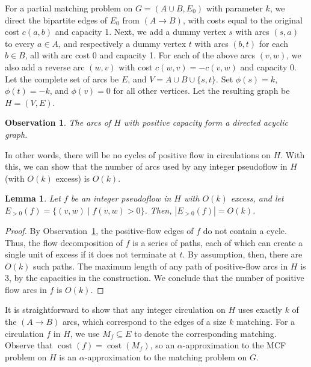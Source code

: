 \documentclass[11pt]{article}
\def\fsupply{\phi}
\theoremstyle{plain}
\newtheorem{lemma}{Lemma}
\newtheorem{observation}{Observation}
\def\cost{\operatorname{cost}}
\begin{document}
For a partial matching problem on $G = (A \cup B, E_0)$ with parameter $k$, we 
direct the bipartite edges of $E_0$ from $(A \to B)$, with costs equal to the 
original cost $c(a, b)$ and capacity 1.
Next, we add a dummy vertex $s$ with arcs $(s, a)$ to every $a \in A$,
and respectively a dummy vertex $t$ with arcs $(b, t)$ for each $b \in B$,
all with arc cost 0 and capacity 1.
For each of the above arcs $(v, w)$, we also add a reverse arc $(w, v)$ with
cost $c(w, v) = -c(v, w)$ and capacity 0.
Let the complete set of arcs be $E$, and $V = A \cup B \cup \{s, t\}$.
Set $\fsupply(s) = k$, $\fsupply(t) = -k$, and $\fsupply(v) = 0$ for all other 
vertices.
Let the resulting graph be $H = (V, E)$.

\begin{observation}
\label{observation:dag}
	The arcs of $H$ with positive capacity form a directed acyclic graph.
\end{observation}

In other words, there will be no cycles of positive flow in circulations on 
$H$. 
With this, we can show that the number of arcs used by any integer pseudoflow 
in $H$ (with $O(k)$ excess) is $O(k)$.

\begin{lemma}
\label{lemma:reduction_count}
	Let $f$ be an integer pseudoflow in $H$ with $O(k)$ excess, and let 
	$E_{>0}(f) = \{(v, w) \mid f(v, w) > 0\}$.
	Then, $|E_{>0}(f)| = O(k)$.
\end{lemma}
\begin{proof}
	By Observation~\ref{observation:dag}, the positive-flow edges of $f$
	do not contain a cycle.
	Thus, the flow decomposition of $f$ is a series of paths, each of which
	can create a single unit of excess if it does not terminate at $t$.
	By assumption, then, there are $O(k)$ such paths.
	The maximum length of any path of positive-flow arcs in $H$ is 3,
	by the capacities in the construction.
	We conclude that the number of positive flow arcs in $f$ is $O(k)$.
\end{proof}

It is straightforward to show that any integer circulation on $H$ uses exactly 
$k$ of the $(A \to B)$ arcs, which correspond to the edges of a size $k$ 
matching.
For a circulation $f$ in $H$, we use $M_f \subseteq E$ to denote the 
corresponding matching.
Observe that $\cost(f) = \cost(M_f)$, so an $\alpha$-approximation to the MCF 
problem on $H$ is an $\alpha$-approximation to the matching problem on $G$.
\end{document}
